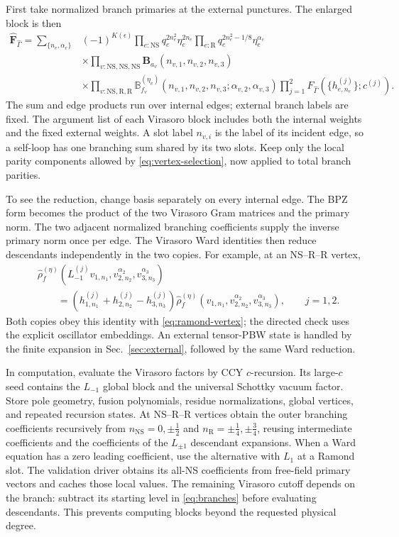\documentclass[11pt]{article}
\newcommand{\NS}{\mathrm{NS}}
\newcommand{\R}{\mathrm R}
\numberwithin{equation}{section}
\begin{document}
First take normalized branch primaries at the external punctures. The
enlarged block is then
\begin{align}
 \widehat{\mathbf F}_{\hat\Gamma}
 =\sum_{\{n_e,\alpha_e\}}{}&(-1)^{K(\epsilon)}
 \prod_{e:\NS}q_e^{2n_e^2}\eta_e^{2n_e}
 \prod_{e:\R}q_e^{2n_e^2-1/8}\eta_e^{\alpha_e}
 \nonumber\\
 &\times\prod_{v:\NS,\NS,\NS}
             \mathbf B_{a_v}(n_{v,1},n_{v,2},n_{v,3})
 \nonumber\\
 &\times\prod_{v:\NS,\R,\R}
             \mathbb B_{f_v}^{(\eta_v)}
                  (n_{v,1},n_{v,2},n_{v,3};\alpha_{v,2},\alpha_{v,3})
 \prod_{j=1}^2F_{\hat\Gamma}(\{h_{e,n_e}^{(j)}\};c^{(j)}).
 \label{eq:double-virasoro}
\end{align}
The sum and edge products run over internal edges; external branch labels
are fixed. The argument list of each Virasoro block includes both the
internal weights and the fixed external weights. A slot label $n_{v,i}$
is the label of its incident edge, so a self-loop has one branching sum
shared by its two slots. Keep only the local parity components allowed by
\eqref{eq:vertex-selection}, now applied to total branch parities.

To see the reduction, change basis separately on every internal edge.
The BPZ form becomes the product of the two Virasoro Gram matrices and
the primary norm. The two adjacent normalized branching coefficients
supply the inverse primary norm once per edge. The Virasoro Ward
identities then reduce descendants independently in the two copies.
For example, at an NS--R--R vertex,
\begin{align}
 &\hat\rho_f^{(\eta)}
 (L_{-1}^{(j)}v_{1,n_1},v_{2,n_2}^{\alpha_2},v_{3,n_3}^{\alpha_3})
 \nonumber\\
 &\qquad=(h_{1,n_1}^{(j)}+h_{2,n_2}^{(j)}-h_{3,n_3}^{(j)})
 \hat\rho_f^{(\eta)}
 (v_{1,n_1},v_{2,n_2}^{\alpha_2},v_{3,n_3}^{\alpha_3}),
 \qquad j=1,2.
 \label{eq:local-virasoro-ward}
\end{align}
Both copies obey this identity with \eqref{eq:ramond-vertex};
the directed check uses the explicit oscillator embeddings.
An external tensor-PBW state is handled by the finite expansion in
Sec.~\ref{sec:external}, followed by the same Ward reduction.

In computation, evaluate the Virasoro factors by CCY $c$-recursion.
Its large-$c$ seed contains the $L_{-1}$ global block and the universal
Schottky vacuum factor. Store pole geometry, fusion polynomials, residue
normalizations, global vertices, and repeated recursion states. At
NS--R--R vertices obtain the outer branching coefficients recursively
from $n_{\NS}=0,\pm\tfrac12$ and
$n_{\R}=\pm\tfrac14,\pm\tfrac34$, reusing intermediate coefficients
and the coefficients of the $L_{\pm1}$ descendant expansions.
When a Ward equation has a zero leading coefficient, use the alternative
with $L_1$ at a Ramond slot. The validation driver obtains its all-NS
coefficients from free-field primary vectors and caches those local
values. The remaining Virasoro cutoff depends on the branch: subtract
its starting level in \eqref{eq:branches} before evaluating descendants.
This prevents computing blocks beyond the requested physical degree.
\end{document}
